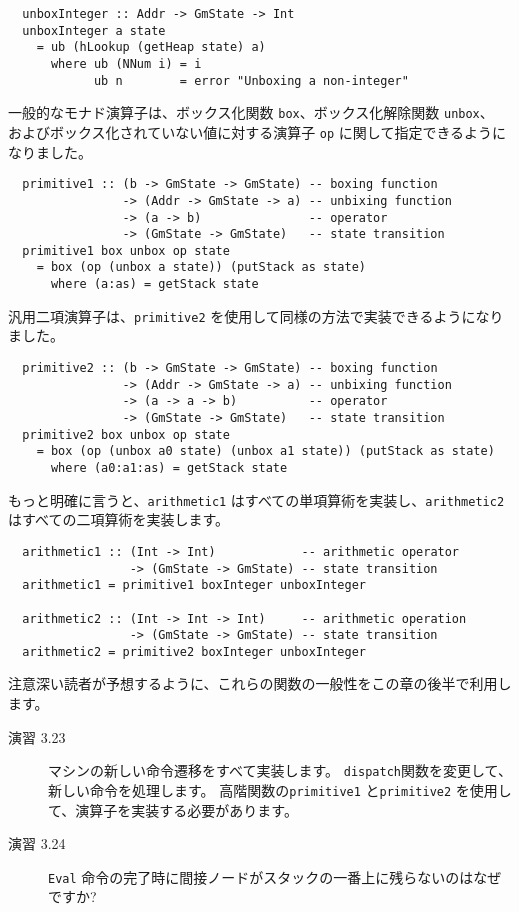 \documentclass{jarticle}
\begin{document}
\begin{verbatim}
  unboxInteger :: Addr -> GmState -> Int
  unboxInteger a state
    = ub (hLookup (getHeap state) a)
      where ub (NNum i) = i
            ub n        = error "Unboxing a non-integer"
\end{verbatim}

一般的なモナド演算子は、ボックス化関数 \texttt{box}、ボックス化解除関数 \texttt{unbox}、
およびボックス化されていない値に対する演算子 \texttt{op} に関して指定できるようになりました。

\begin{verbatim}
  primitive1 :: (b -> GmState -> GmState) -- boxing function
                -> (Addr -> GmState -> a) -- unbixing function
                -> (a -> b)               -- operator
                -> (GmState -> GmState)   -- state transition
  primitive1 box unbox op state
    = box (op (unbox a state)) (putStack as state)
      where (a:as) = getStack state
\end{verbatim}

汎用二項演算子は、\texttt{primitive2} を使用して同様の方法で実装できるようになりました。

\begin{verbatim}
  primitive2 :: (b -> GmState -> GmState) -- boxing function
                -> (Addr -> GmState -> a) -- unbixing function
                -> (a -> a -> b)          -- operator
                -> (GmState -> GmState)   -- state transition
  primitive2 box unbox op state
    = box (op (unbox a0 state) (unbox a1 state)) (putStack as state)
      where (a0:a1:as) = getStack state
\end{verbatim}

もっと明確に言うと、\texttt{arithmetic1} はすべての単項算術を実装し、\texttt{arithmetic2} はすべての二項算術を実装します。

\begin{verbatim}
  arithmetic1 :: (Int -> Int)            -- arithmetic operator
                 -> (GmState -> GmState) -- state transition
  arithmetic1 = primitive1 boxInteger unboxInteger

  arithmetic2 :: (Int -> Int -> Int)     -- arithmetic operation
                 -> (GmState -> GmState) -- state transition
  arithmetic2 = primitive2 boxInteger unboxInteger
\end{verbatim}

注意深い読者が予想するように、これらの関数の一般性をこの章の後半で利用します。

\begin{description}
	\item[演習 3.23] マシンの新しい命令遷移をすべて実装します。
	      \texttt{dispatch}関数を変更して、新しい命令を処理します。
	      高階関数の\texttt{primitive1} と\texttt{primitive2} を使用して、演算子を実装する必要があります。
	\item[演習 3.24] \texttt{Eval} 命令の完了時に間接ノードがスタックの一番上に残らないのはなぜですか?
\end{description}
\end{document}
